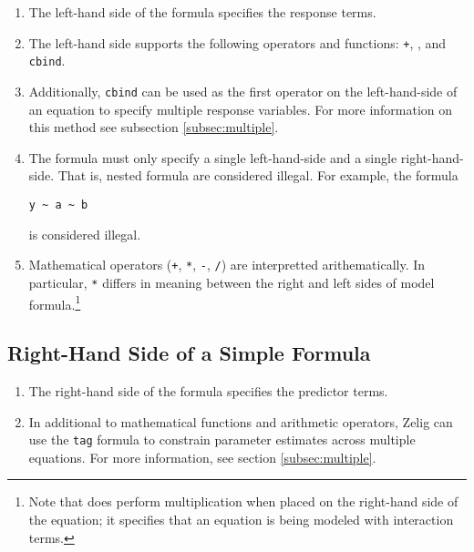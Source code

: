 \documentclass{article}
\begin{document}
\begin{enumerate}

  \item The left-hand side of the formula specifies the response terms.

  \item The left-hand side supports the following operators and functions:
    {\tt +}, {\tt *}, and {\tt cbind}.

  \item Additionally, \verb|cbind| can be used as the first operator on the
    left-hand-side of an equation to specify multiple response variables. For
    more information on this method see subsection \ref{subsec:multiple}.

  \item The formula must only specify a single left-hand-side and a single
    right-hand-side. That is, nested formula are considered illegal. For
    example, the formula \begin{verbatim}y ~ a ~ b\end{verbatim} is considered 
    illegal.

  \item Mathematical operators (\verb|+|, \verb|*|, \verb|-|, \verb|/|) are
    interpretted arithematically. In particular, \verb|*| differs in meaning
    between the right and left sides of model formula.\footnote{Note that 
    {\tt *} does perform multiplication when placed on the right-hand side of
    the equation; it specifies that an equation is being modeled with
    interaction terms.}

\end{enumerate}


\subsection{Right-Hand Side of a Simple Formula}
\label{subsec:rhs}

\begin{enumerate}

  \item The right-hand side of the formula specifies the predictor terms.

  \item In additional to mathematical functions and arithmetic operators, Zelig
    can use the \verb|tag| formula to constrain parameter estimates across
    multiple equations. For more information, see section \ref{subsec:multiple}.

\end{enumerate}
\end{document}
